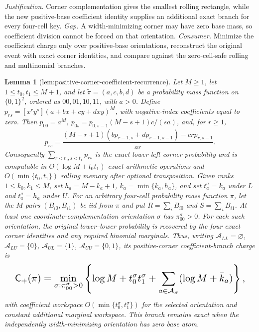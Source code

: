 \documentclass{article}
\newtheorem{lemma}{Lemma}
\begin{document}
\par\smallskip\noindent \textit{Justification.} Corner complementation gives the smallest rolling rectangle, while the new positive-base coefficient identity supplies an additional exact branch for every four-cell key. \textit{Gap.} A width-minimizing corner may have zero base mass, so coefficient division cannot be forced on that orientation. \textit{Consumer.} Minimize the coefficient charge only over positive-base orientations, reconstruct the original event with exact corner identities, and compare against the zero-cell-safe rolling and multinomial branches.

\begin{lemma}[lem:positive-corner-coefficient-recurrence]\label{lem:positive-corner-coefficient-recurrence}
Let \(M\ge1\), let \(1\le t_0,t_1\le M+1\), and let \(\widetilde\pi=(a,c,b,d)\) be a probability mass function on \(\{0,1\}^2\), ordered as \(00,01,10,11\), with \(a>0\). Define \(p_{rs}=[x^ry^s](a+bx+cy+dxy)^M\), with negative-index coefficients equal to zero. Then \(p_{00}=a^M\), \(p_{0s}=p_{0,s-1}(M-s+1)c/(sa)\), and, for \(r\ge1\), \[p_{rs}=\frac{(M-r+1)(bp_{r-1,s}+dp_{r-1,s-1})-crp_{r,s-1}}{ar}.\] Consequently \(\sum_{r<t_0,s<t_1}p_{rs}\) is the exact lower-left corner probability and is computable in \(O(\log M+t_0t_1)\) exact arithmetic operations and \(O(\min\{t_0,t_1\})\) rolling memory after optional transposition. Given ranks \(1\le k_0,k_1\le M\), set \(h_a=M-k_a+1\), \(\bar k_a=\min\{k_a,h_a\}\), and set \(t_a^\sigma=k_a\) under \(L\) and \(t_a^\sigma=h_a\) under \(U\). For an arbitrary four-cell probability mass function \(\pi\), let the \(M\) pairs \((B_{i0},B_{i1})\) be iid from \(\pi\) and put \(R=\sum_iB_{i0}\) and \(S=\sum_iB_{i1}\). At least one coordinate-complementation orientation \(\sigma\) has \(\pi^\sigma_{00}>0\). For each such orientation, the original lower--lower probability is recovered by the four exact corner identities and any required binomial marginals. Thus, writing \(\mathcal A_{LL}=\varnothing\), \(\mathcal A_{LU}=\{0\}\), \(\mathcal A_{UL}=\{1\}\), \(\mathcal A_{UU}=\{0,1\}\), its positive-corner coefficient-branch charge is
\[
\makebox[\linewidth][c]{\resizebox{0.98\linewidth}{!}{\par\noindent \makebox[\linewidth][c]{\resizebox{0.98\linewidth}{!}{\(\displaystyle \displaystyle \mathsf C_+(\pi)=\min_{\sigma:\pi^\sigma_{00}>0}\left\{\log M+t_0^\sigma t_1^\sigma+\sum_{a\in\mathcal A_\sigma}(\log M+\bar k_a)\right\},\)}}\par\noindent}}
\]
with coefficient workspace \(O(\min\{t_0^\sigma,t_1^\sigma\})\) for the selected orientation and constant additional marginal workspace. This branch remains exact when the independently width-minimizing orientation has zero base atom.
\end{lemma}
\end{document}
